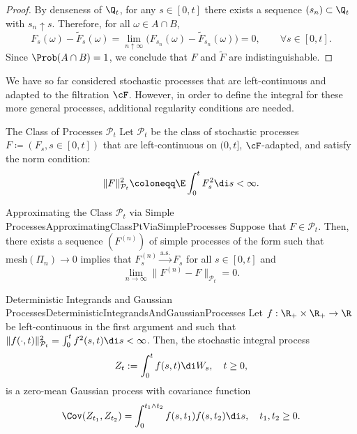 \begin{proof}
	By denseness of \(\Q_t\), for any \(s \in [0, t]\) there exists a sequence \((s_n) \subset \Q_t\) with \(s_n \uparrow s\). Therefore, for all \(\omega \in A \cap B\),
	\begin{equation}\label{eq:Indistinguishable}
		F_s(\omega) - \widetilde{F}_s(\omega)
		= \lim_{n \uparrow \infty} \big(F_{s_n}(\omega) - \widetilde{F}_{s_n}(\omega)\big)
		= 0, \qquad \forall s \in [0, t].
	\end{equation}
	Since \(\Prob(A \cap B) = 1\), we conclude that \(F\) and \(\widetilde{F}\) are indistinguishable.
\end{proof}

We have so far considered stochastic processes that are left-continuous and adapted to the filtration \(\cF\). However, in order to define the \Ito{} integral for these more general processes, additional regularity conditions are needed.

\begin{defn}{The Class of Processes $\mathcal{P}_t$}{}
	Let $\mathcal{P}_t$ be the class of stochastic processes $F \coloneqq (F_s, s \in [0, t])$ that are left-continuous on $(0, t]$, $\cF$-adapted, and satisfy the norm condition:
	\begin{equation*}
		\|F\|_{\mathcal{P}_t}^2 \coloneqq \E \int_0^t F_s^2 \di s < \infty.
	\end{equation*}
\end{defn}

\begin{thm}{Approximating the Class $\mathcal{P}_t$ via Simple Processes}{ApproximatingClassPtViaSimpleProcesses}
	Suppose that $F \in \mathcal{P}_t$. Then, there exists a sequence $(F^{(n)})$ of simple processes of the form  such that $\mathrm{mesh}(\Pi_n) \to 0$ implies that $F_s^{(n)} \xrightarrow{\text{a.s.}} F_s$ for all $s \in [0, t]$ and
	\begin{equation}\label{eq:L2ConvergenceSimple}
		\lim_{n \to \infty} \|F^{(n)} - F\|_{\mathcal{P}_t} = 0.
	\end{equation}
\end{thm}

\begin{prop}{Deterministic Integrands and Gaussian Processes}{DeterministicIntegrandsAndGaussianProcesses}
	Let $f : \R_+ \times \R_+ \to \R$ be left-continuous in the first argument and such that $\|f(\cdot, t)\|_{\mathcal{P}_t}^2 = \int_0^t f^2(s, t) \di s < \infty$. Then, the stochastic integral process
	\begin{equation}\label{eq:GaussianIntegralProcess}
		Z_t := \int_0^t f(s, t) \di W_s, \quad t \ge 0,
	\end{equation}
	is a zero-mean Gaussian process with covariance function
	\begin{equation}\label{eq:GaussianCovariance}
		\Cov(Z_{t_1}, Z_{t_2}) = \int_0^{t_1 \wedge t_2} f(s, t_1) f(s, t_2) \di s, \quad t_1, t_2 \ge 0.
	\end{equation}
\end{prop}

